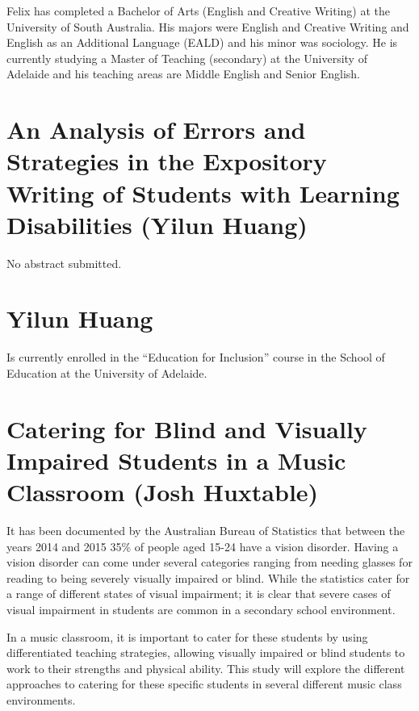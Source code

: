 \documentclass[twoside,12pt,a4paper,notitlepage]{memoir}
\begin{document}
Felix has completed a Bachelor of Arts (English and Creative Writing) at the University of South Australia. His majors were English and Creative Writing and English as an Additional Language (EALD) and his minor was sociology. He is currently studying a Master of Teaching (secondary) at the University of Adelaide and his teaching areas are Middle English and Senior English.




\pagebreak
\section*{An Analysis of Errors and Strategies in the Expository Writing of Students with Learning Disabilities (Yilun Huang)}
\label{aut:huang}


No abstract submitted.

\section*{Yilun Huang}

Is currently enrolled in the ``Education for Inclusion'' course in the School of Education at the University of Adelaide.



\pagebreak
\section*{Catering for Blind and Visually Impaired Students in a Music Classroom (Josh Huxtable)}
\label{aut:huxtable}


It has been documented by the Australian Bureau of Statistics that between the years 2014 and 2015 35\% of people aged 15-24 have a vision disorder. Having a vision disorder can come under several categories ranging from needing glasses for reading to being severely visually impaired or blind. While the statistics cater for a range of different states of visual impairment; it is clear that severe cases of visual impairment in students are common in a secondary school environment.


In a music classroom, it is important to cater for these students by using differentiated teaching strategies, allowing visually impaired or blind students to work to their strengths and physical ability. This study will explore the different approaches to catering for these specific students in several different music class environments.
\end{document}

